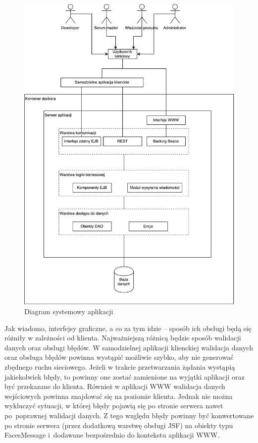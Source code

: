 \begin{figure}[h!]
	\centering
	\includegraphics[width=13.5cm]{rysunki/diagsys.pdf}	
	\caption{Diagram systemowy aplikacji}
	\label{fig:diagsys}
\end{figure}

Jak wiadomo, interfejsy graficzne, a co za tym idzie – sposób ich obsługi będą się różniły w zależności od klienta. Najważniejszą różnicą będzie sposób walidacji danych oraz obsługi błędów. W samodzielnej aplikacji klienckiej walidacja danych oraz obsługa błędów powinna wystąpić możliwie szybko, aby nie generować zbędnego ruchu sieciowego. Jeżeli w trakcie przetwarzania żądania wystąpią jakiekolwiek błędy, to powinny one zostać zamienione na wyjątki aplikacji oraz być przekazane do klienta. Również w aplikacji WWW walidacja danych wejściowych powinna znajdować się na poziomie klienta. Jednak nie można wykluczyć sytuacji, w której błędy pojawią się po stronie serwera nawet po~poprawnej walidacji danych. Z tego względu błędy powinny być konwertowane po stronie serwera (przez dodatkową warstwę obsługi JSF) na obiekty typu FacesMessage i~dodawane bezpośrednio do kontekstu aplikacji WWW. 

